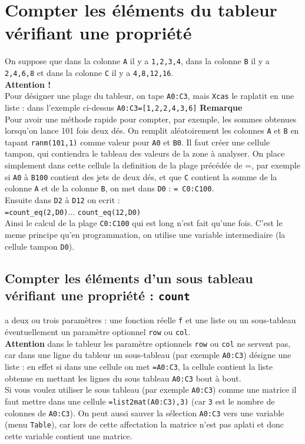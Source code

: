 \documentclass[a4paper,11pt]{book}
\begin{document}
\section{Compter les \'el\'ements du tableur v\'erifiant une propri\'et\'e}
 On suppose que dans la colonne {\tt A} il y a {\tt 1,2,3,4}, dans la colonne
{\tt B} il y a {\tt 2,4,6,8} et dans la colonne {\tt C} il y a 
{\tt 4,8,12,16}.\\
{\bf Attention !}\\
Pour d\'esigner une plage du tableur, on tape {\tt A0:C3}, mais {\tt Xcas} le 
raplatit en une liste : dans l'exemple ci-dessus  {\tt A0:C3=[1,2,2,4,3,6]} 
{\bf Remarque}\\
Pour avoir une m\'ethode rapide pour compter, par exemple, les sommes obtenues
lorsqu'on  lance  101 fois deux d\'es. On remplit al\'eatoirement les colonnes
{\tt A} et {\tt B} en tapant  {\tt ranm(101,1)} comme valeur pour {\tt A0} et 
{\tt B0}.
Il faut cr\'eer une cellule tampon, qui contiendra le tableau des
valeurs de la zone \`a analyser. On place simplement dans
cette cellule la definition de la plage pr\'ec\'ed\'ee de =, par exemple
si {\tt A0} \`a {\tt B100} contient des jets de deux d\'es, et que 
{\tt C} contient la somme de la colonne {\tt A} et de la colonne {\tt B},
on met dans {\tt D0} : {\tt = C0:C100}.\\
Ensuite dans {\tt D2} \`a {\tt D12} on ecrit :\\
{\tt =count\_eq(2,D0)}... {\tt count\_eq(12,D0)}\\
Ainsi le calcul de la plage {\tt C0:C100} qui est long n'est fait qu'une
fois. C'est le meme principe qu'en programmation, on utilise une
variable intermediaire (la cellule tampon {\tt D0}).
\subsection{Compter les \'el\'ements d'un sous tableau v\'erifiant une propri\'et\'e : {\tt count}}
 a deux ou trois param\`etres : une fonction r\'eelle 
{\tt f} et une liste ou un sous-tableau \'eventuellement un param\`etre 
optionnel {\tt row} ou {\tt col}.\\

{\bf Attention} dans le tableur les param\`etre optionnels {\tt row} ou 
{\tt col} ne servent pas, car dans une ligne du tableur 
un sous-tableau (par exemple {\tt A0:C3}) d\'esigne une liste : en effet
si dans une cellule on met {\tt =A0:C3}, la cellule contient la liste obtenue 
en mettant les lignes du sous tableau {\tt A0:C3} bout \`a bout.\\
Si vous voulez utiliser le sous tableau (par exemple {\tt A0:C3}) comme une 
matrice il faut mettre dans une cellule {\tt =list2mat(A0:C3),3)} (car {\tt 3} 
est le nombre de colonnes de {\tt A0:C3}). On peut aussi sauver la s\'election 
{\tt A0:C3} vers une variable (menu {\tt Table}), car lors de cette affectation
la matrice n'est pas aplati et donc cette variable contient une matrice.\\
\end{document}
